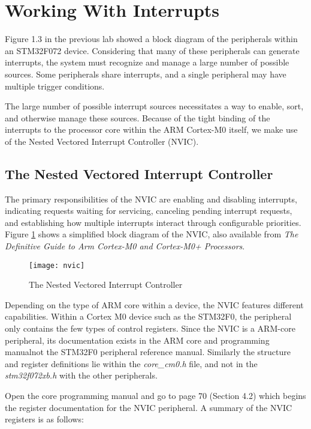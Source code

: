 \documentclass[openany,11pt,fleqn]{book} %
\begin{document}
\section{Working With Interrupts}
Figure 1.3 in the previous lab showed a block diagram of the peripherals within an STM32F072 device. Considering that many of these peripherals can generate interrupts, the system must recognize and manage a large number of possible sources. Some peripherals share interrupts, and a single peripheral may have multiple trigger conditions.  

The large number of possible interrupt sources necessitates a way to enable, sort, and otherwise manage these sources. Because of the tight binding of the interrupts to the processor core within the ARM Cortex-M0 itself, we make use of the Nested Vectored Interrupt Controller (NVIC).

\subsection{\color{orange}The Nested Vectored Interrupt Controller}
The primary responsibilities of the NVIC are enabling and disabling interrupts, indicating requests waiting for servicing, canceling pending interrupt requests, and establishing how multiple interrupts interact through configurable priorities. Figure \ref{nvic} shows a simplified block diagram of the NVIC, also available from \textit{The Definitive Guide to Arm Cortex-M0 and Cortex-M0+ Processors}.
    
\begin{figure}[h]
    \centering\texttt{[image: nvic]}
    \caption{The Nested Vectored Interrupt Controller}
    \label{nvic}
\end{figure}

Depending on the type of ARM core within a device, the NVIC features different capabilities. Within a Cortex M0 device such as the STM32F0, the peripheral only contains the few types of control registers. Since the NVIC is a ARM-core peripheral, its documentation exists in the ARM core and programming manual\textemdash not the STM32F0 peripheral reference manual. Similarly the structure and register definitions lie within the \textit{core\_cm0.h} file, and not in the \textit{stm32f072xb.h} with the other peripherals.  

Open the core programming manual and go to page 70 (Section 4.2) which begins the register documentation for the NVIC peripheral. A summary of the NVIC registers is as follows:
\end{document}
